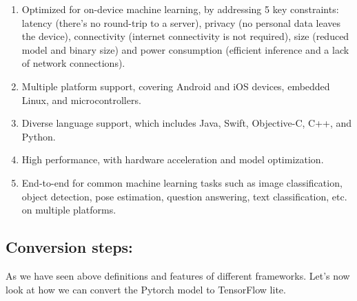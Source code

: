 \begin{enumerate}
  \item Optimized for on-device machine learning, by addressing 5 key constraints: latency (there's no round-trip to a server), privacy (no personal data leaves the device), connectivity (internet connectivity is not required), size (reduced model and binary size) and power consumption (efficient inference and a lack of network connections).
  \item Multiple platform support, covering Android and iOS devices, embedded Linux, and microcontrollers.
  \item Diverse language support, which includes Java, Swift, Objective-C, C++, and Python.
  \item High performance, with hardware acceleration and model optimization.
  \item End-to-end for common machine learning tasks such as image classification, object detection, pose estimation, question answering, text classification, etc. on multiple platforms.
\end{enumerate}

\subsection{Conversion steps:}

As we have seen above definitions and features of different frameworks. Let's now look at how we can convert the Pytorch model to TensorFlow lite. 

